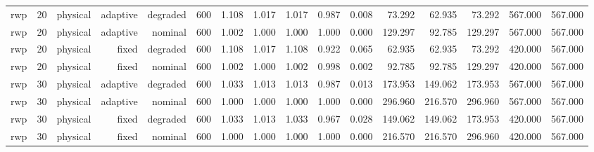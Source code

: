 \begin{tabular}{lrrrrrrrrrrrrrrr}
rwp & 20 & physical & adaptive & degraded & 600 & 1.108 & 1.017 & 1.017 & 0.987 & 0.008 & 73.292 & 62.935 & 73.292 & 567.000 & 567.000 \\
rwp & 20 & physical & adaptive & nominal & 600 & 1.002 & 1.000 & 1.000 & 1.000 & 0.000 & 129.297 & 92.785 & 129.297 & 567.000 & 567.000 \\
rwp & 20 & physical & fixed & degraded & 600 & 1.108 & 1.017 & 1.108 & 0.922 & 0.065 & 62.935 & 62.935 & 73.292 & 420.000 & 567.000 \\
rwp & 20 & physical & fixed & nominal & 600 & 1.002 & 1.000 & 1.002 & 0.998 & 0.002 & 92.785 & 92.785 & 129.297 & 420.000 & 567.000 \\
rwp & 30 & physical & adaptive & degraded & 600 & 1.033 & 1.013 & 1.013 & 0.987 & 0.013 & 173.953 & 149.062 & 173.953 & 567.000 & 567.000 \\
rwp & 30 & physical & adaptive & nominal & 600 & 1.000 & 1.000 & 1.000 & 1.000 & 0.000 & 296.960 & 216.570 & 296.960 & 567.000 & 567.000 \\
rwp & 30 & physical & fixed & degraded & 600 & 1.033 & 1.013 & 1.033 & 0.967 & 0.028 & 149.062 & 149.062 & 173.953 & 420.000 & 567.000 \\
rwp & 30 & physical & fixed & nominal & 600 & 1.000 & 1.000 & 1.000 & 1.000 & 0.000 & 216.570 & 216.570 & 296.960 & 420.000 & 567.000 \\
\bottomrule
\end{tabular}